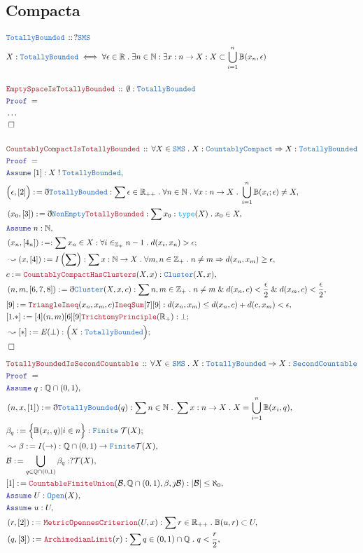 \documentclass[12pt]{scrartcl}
\newcommand{\TYPE}[1]{\textcolor{NavyBlue}{\mathtt{#1}}}
\newcommand{\FUNC}[1]{\textcolor{Cerulean}{\mathtt{#1}}}
\newcommand{\LOGIC}[1]{\textcolor{Blue}{\mathtt{#1}}}
\newcommand{\THM}[1]{\textcolor{Maroon}{\mathtt{#1}}}
\renewcommand{\.}{\; . \;}
\newcommand{\de}{: \kern 0.1pc =}
\newcommand{\IsNot}{\; ! \;}
\newcommand{\Act}[1]{\left( #1 \right)}
\newcommand{\Theorem}[2]{& \THM{#1} \, :: \, #2 \\ & \Proof = \\ }
\newcommand{\DeclareType}[2]{& \TYPE{#1} \, :: \, #2 \\}
\newcommand{\DefineType}[3]{& #1 : \TYPE{#2} \iff #3 \\}
\newcommand{\Page}[1]{ \begin{align*} #1 \end{align*}   }
\newcommand{ \bd }{ \ByDef }
\newcommand{\NoProof}{ & \ldots \\ \EndProof}
\renewcommand{\And}{\; \& \;}
\newcommand{\Imply}{\Rightarrow}
\newcommand{\Int}{\mathbb{Z} }
\newcommand{\Reals}{\mathbb{R} }
\newcommand{\Rats}{\mathbb{Q} }
\newcommand{\Nat}{\mathbb{N} }
\newcommand{\Say}[3]{& #1 \de #2 : #3, \\}
\newcommand{\Conclude}[3]{& #1 \de #2 : #3; \\}
\newcommand{\Derive}[3]{& \leadsto #1 \de #2 : #3, \\}
\newcommand{\DeriveConclude}[3]{& \leadsto #1 \de #2 : #3 ; \\}
\newcommand{\Assume}[2]{& \LOGIC{Assume} \; #1 : #2, \\}
\newcommand{\QED}{\; \square}
\newcommand{\EndProof}{& \QED \\}
\newcommand{\ByDef}{\eth}
\newcommand{\ByConstr}{\jmath}
\newcommand{\Proof}{\LOGIC{Proof} \; }
\newcommand{\T}{\mathcal{T}}
\begin{document}
\subsection{Compacta}
\Page{
	\DeclareType{TotallyBounded}{?\TYPE{SMS}}
	\DefineType{X}{TotallyBounded}{\forall \epsilon \in \Reals \. \exists n \in \Nat : \exists x : n \to X : X \subset \bigcup^n_{i=1} \mathbb{B}(x_n,\epsilon)}
	\\
	\Theorem{EmptySpaceIsTotallyBounded}{\emptyset : \TYPE{TotallyBounded}}
	\NoProof
	\\
	\Theorem{CountablyCompactIsTotallyBounded}{\forall X \in \TYPE{SMS} \. X : \TYPE{CountablyCompact} \Imply X : \TYPE{TotallyBounded}  }
	\Assume{[1]}{X \IsNot \TYPE{TotallyBounded}}
	\Say{\Big(\epsilon,[2]\Big)}{\bd \TYPE{TotallyBounded}}{\sum \epsilon \in \Reals_{++} \. \forall n \in \Nat \. \forall x : n \to X \.  \bigcup^n_{i=1} \mathbb{B}(x_i;\epsilon) \neq X}
	\Say{\Act{x_0,[3]}}{\bd\TYPE{NonEmpty}\THM{TotallyBounded}}{\sum x_0 : \FUNC{type}(X) \. x_0 \in X}
	\Assume{n}{\Nat}
	\Conclude{\Act{x_n,[4_n]}}{}{\sum x_n \in X : \forall i \in_{\Int_+} n-1 \. d(x_i,x_n) > \epsilon }
	\Derive{\Act{x, [4] }}{ I\Act{\sum} }{ \sum x : \Nat \to X \. \forall m,n \in \Int_+ \. n \neq m \Imply d(x_n,x_m) \ge \epsilon }
	\Say{c}{\THM{CountablyCompactHasClusters}(X,x) }{\TYPE{Cluster}(X,x)}
	\Say{\Act{n,m,[6,7,8]}}{\bd \TYPE{Cluster}(X,x,c)}{\sum n,m \in \Int_+ \. n \neq m \And d(x_n,c) < \frac{\epsilon}{2} \And   d(x_m,c) < \frac{\epsilon}{2}}
	\Say{[9]}{\THM{TriangleIneq}(x_n,x_m,c)\THM{IneqSum}[7][9]}{d(x_n,x_m) \le d(x_n,c) + d(c,x_m) < \epsilon}
	\Conclude{[1.*]}{[4](n,m)[6][9]\THM{TrichtomyPrinciple}(\Reals_{+})}{\bot}
	\DeriveConclude{[*]}{E(\bot)}{\Big( X : \TYPE{TotallyBounded}  \Big)}
	\EndProof
}\Page{
	\Theorem{TotallyBoundedIsSecondCountable}{\forall X \in \TYPE{SMS} \.  X : \TYPE{TotallyBounded} \Imply X : \TYPE{SecondCountable} }
	\Assume{q}{\Rats \cap (0,1)}
	\Say{\Act{n,x,[1]}}{\bd \TYPE{TotallyBounded}(q)}{\sum n \in \Nat \. \sum x : n \to X \. X = \bigcup^n_{i=1} \mathbb{B}(x_i,q) }
	\Conclude{\beta_q}{\Big\{ \mathbb{B}(x_i,q)  | i \in n      \Big\}}{\TYPE{Finite} \; \T(X)}
	\Derive{\beta}{I(\to)}{ \Rats \cap (0,1) \to \TYPE{Finite} \T(X)}
	\Say{\mathcal{B}}{\bigcup_{q \in \Rats \cap (0,1)} \beta_q}{?\T(X)}
	\Say{[1]}{\THM{CountableFiniteUnion}(\mathcal{B},\Rats \cap (0,1),\beta,\ByConstr \mathcal{B})}{ |\mathcal{B}| \le \aleph_0}
	\Assume{U}{\TYPE{Open}(X)}
	\Assume{u}{U}
	\Say{\Act{r,[2]}}{\THM{MetricOpennesCriterion}(U,x)}{\sum r \in \Reals_{++} \. \mathbb{B}(u,r) \subset U  }
	\Say{\Act{q,[3]}}{\THM{ArchimedianLimit}(r)}{ \sum q \in (0,1) \cap \Rats  \. q < \frac{r}{2} }
}
\end{document}
